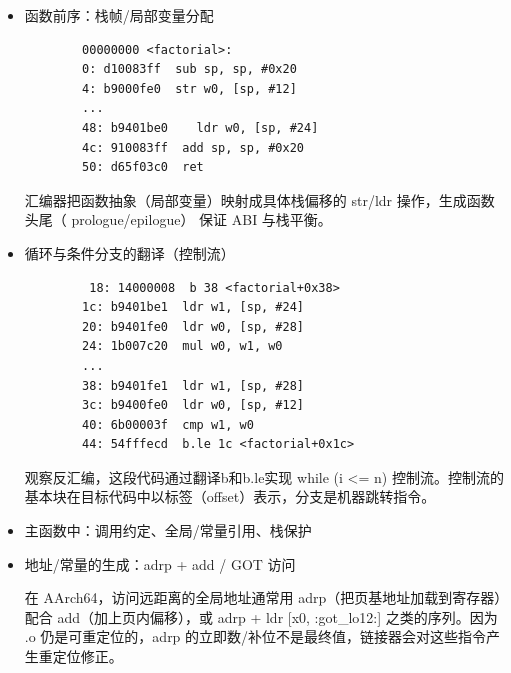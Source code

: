 \documentclass[a4paper]{article}
\begin{document}
\begin{itemize}
	\item 函数前序：栈帧/局部变量分配
	
	\begin{lstlisting}
		00000000 <factorial>:
		0: d10083ff  sub sp, sp, #0x20
		4: b9000fe0  str w0, [sp, #12]
		...
		48: b9401be0 	ldr w0, [sp, #24]
		4c: 910083ff  add sp, sp, #0x20
		50: d65f03c0  ret
	\end{lstlisting}
	汇编器把函数抽象（局部变量）映射成具体栈偏移的 str/ldr 操作，生成函数头尾（ prologue/epilogue） 保证 ABI 与栈平衡。
	\item 循环与条件分支的翻译（控制流）
	
	\begin{lstlisting}
		 18: 14000008  b 38 <factorial+0x38>
		1c: b9401be1  ldr w1, [sp, #24]
		20: b9401fe0  ldr w0, [sp, #28]
		24: 1b007c20  mul w0, w1, w0
		...
		38: b9401fe1  ldr w1, [sp, #28]
		3c: b9400fe0  ldr w0, [sp, #12]
		40: 6b00003f  cmp w1, w0
		44: 54fffecd  b.le 1c <factorial+0x1c>
	\end{lstlisting}
	观察反汇编，这段代码通过翻译b和b.le实现 while (i <= n) 控制流。控制流的基本块在目标代码中以标签（offset）表示，分支是机器跳转指令。
	\item 主函数中：调用约定、全局/常量引用、栈保护
	\item 地址/常量的生成：adrp + add / GOT 访问
	
	在 AArch64，访问远距离的全局地址通常用 adrp（把页基地址加载到寄存器）配合 add（加上页内偏移），或 adrp + ldr [x0, :got\_lo12:] 之类的序列。因为 .o 仍是可重定位的，adrp 的立即数/补位不是最终值，链接器会对这些指令产生重定位修正。
\end{itemize}
\end{document}
